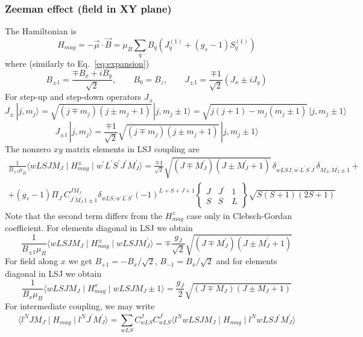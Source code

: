 \documentclass[a4paper,oneside,12pt]{extarticle}
\begin{document}
\subsubsection {Zeeman effect (field in XY plane)}
%
The Hamiltonian is
$$
H_{mag} = -\vec{\mu} \cdot \vec{B} = \mu_B \sum_q B_q (J_q^{(1)} + (g_s-1)S_q^{(1)})
$$
%
where (similarly to Eq.~\ref{eq:expansion})
$$
B_{\pm 1} = \frac{\mp B_x + i B_y}{\sqrt{2}}, \qquad B_0 = B_z, \qquad J_{\pm 1} = \frac{\mp 1}{\sqrt{2}} (J_x \pm i J_y)
$$
%
For step-up and step-down operators $J_{\pm}$
$$
J_{\pm}\, |j,m_j\rangle = \sqrt{(j\mp m_j)(j \pm m_j + 1)}\, |j,m_j\pm 1\rangle =
\sqrt{j(j+1)-m_j(m_j \pm 1)}\, |j,m_j\pm 1\rangle
$$
$$
J_{\pm 1}\, |j,m_j\rangle = \frac{\mp 1}{\sqrt{2}} \sqrt{(j\mp m_j)(j \pm m_j + 1)}\, |j,m_j\pm 1\rangle
$$
%
The nonzero $xy$ matrix elements in LSJ coupling are
%
\begin{multline}
\frac{1}{B_{\pm 1}\mu_B} \langle wLSJM_J \mid H_{mag}^{\pm} \mid w^{\prime}L^{\prime}S^{\prime}J^{\prime}M_J^{\prime} \rangle =
\frac{\mp 1}{\sqrt{2}}
\sqrt{(J\mp M_J^{\prime})(J \pm M_J^{\prime} + 1)}\, \delta_{wLSJ,w^{\prime}L^{\prime}S^{\prime}J^{\prime}}
\delta_{M_J,M_J^{\prime}\pm 1} + \\ +
(g_s-1)\Pi_{J^{\prime}} C_{J^{\prime}M_J^{\prime}\, 1 \pm 1}^{JM_J}
\delta_{wLS, w^{\prime}L^{\prime}S^{\prime}}
(-1)^{L+S+J+1}
\left \{
\begin{array}{ccc}
J & J^{\prime} & 1 \\
S & S & L
\end{array}
\right \}
\sqrt{S(S+1)(2S+1)}
\end{multline}
%
Note that the second term differs from the $H_{mag}^z$ case only in Clebsch-Gordan coefficient. For elements diagonal in LSJ we obtain
$$
\frac{1}{B_{\pm 1}\mu_B} \langle wLSJM_J \mid H_{mag}^{\pm} \mid wLSJM_J^{\prime} \rangle = \mp \frac{g_J}{\sqrt{2}}
\sqrt{(J\mp M_J^{\prime})(J \pm M_J^{\prime} + 1)} 
$$
For field along $x$ we get $B_{+1}=-B_x/\sqrt{2}$, $B_{-1}=B_x/\sqrt{2}$ and for elements diagonal in LSJ we obtain
$$
\frac{1}{B_x\mu_B} \langle wLSJM_J \mid H_{mag}^{x} \mid wLSJ M_J\pm 1 \rangle = \frac{g_J}{2}
\sqrt{(J\mp M_J)(J \pm M_J + 1)} 
$$
%
For intermediate coupling, we may write
%
\begin{equation}
\langle l^N JM_J \mid H_{mag} \mid l^N J^{\prime}M_J^{\prime} \rangle = 
\sum_{wLS} C^J_{wLS} C^{J^{\prime}}_{wLS}
\langle l^N wLSJM_J \mid H_{mag} \mid l^N wLS J^{\prime}M_J^{\prime} \rangle
\end{equation}
%
\end{document}

